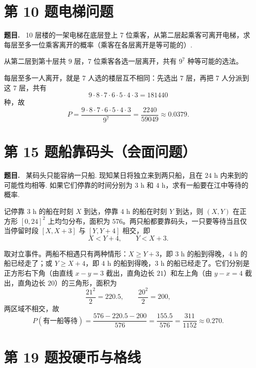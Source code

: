 \documentclass{article}
\newenvironment{problem}{\par\medskip\noindent\textbf{题目.}\ }{\par\smallskip}
\begin{document}
\section*{第 10 题\quad 电梯问题}

\begin{problem}
  10 层楼的一架电梯在底层登上 7 位乘客，从第二层起乘客可离开电梯，求每层至多一位乘客离开的概率（乘客在各层离开是等可能的）.
\end{problem}

\begin{solution}
  从第二层到第十层共 $9$ 层，7 位乘客各选一层离开，共有 $9^7$ 种等可能的选法。

  每层至多一人离开，就是 7 人选的楼层互不相同：先选出 $7$ 层，再把 7 人分派到这 $7$ 层，共有
  \[
    9\cdot8\cdot7\cdot6\cdot5\cdot4\cdot3=181440
  \]
  种，故
  \[
    P=\frac{9\cdot8\cdot7\cdot6\cdot5\cdot4\cdot3}{9^7}
    =\frac{2240}{59049}\approx 0.0379 .
  \]
\end{solution}

\section*{第 15 题\quad 船靠码头（会面问题）}

\begin{problem}
  某码头只能容纳一只船. 现知某日将独立来到两只船，且在 $24$ h 内来到的可能性均相等. 如果它们停靠的时间分别为 $3$ h 和
  $4$ h，求有一船要在江中等待的概率.
\end{problem}

\begin{solution}
  记停靠 $3$ h 的船在时刻 $X$ 到达，停靠 $4$ h 的船在时刻 $Y$ 到达，则 $(X,Y)$ 在正方形 $[0,24]^2$ 上均匀分布，面积为
  $576$。两只船都要靠码头，一只要等待当且仅当停留时段 $[X,X+3]$ 与 $[Y,Y+4]$ 相交，即
  \[
    X<Y+4,\qquad Y<X+3 .
  \]

  取对立事件。两船不相遇只有两种情形：$X\ge Y+3$，即 $3$ h 的船到得晚，$4$ h 的船已经走了；或 $Y\ge X+4$，即 $4$ h
  的船到得晚，$3$ h 的船已经走了。它们分别是正方形右下角（由直线 $x-y=3$ 截出，直角边长 $21$）和左上角（由
  $y-x=4$ 截出，直角边长 $20$）的三角形，面积为
  \[
    \frac{21^2}{2}=220.5,\qquad \frac{20^2}{2}=200,
  \]
  两区域不相交，故
  \[
    P\left(\text{有一船等待}\right)
    =\frac{576-220.5-200}{576}
    =\frac{155.5}{576}=\frac{311}{1152}\approx 0.270 .
  \]

\end{solution}

\section*{第 19 题\quad 投硬币与格线}
\end{document}
